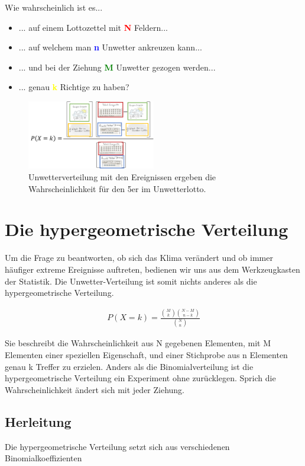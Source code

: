 \begin{refsection}
Wie wahrscheinlich ist es...

\begin{itemize}
\item ... auf einem Lottozettel mit \textcolor{red}{\textbf{N}} Feldern...
\item ... auf welchem man \textcolor{blue}{\textbf{n}} Unwetter ankreuzen kann...
\item ... und bei der Ziehung \textcolor{green}{\textbf{M}} Unwetter gezogen werden...
\item ... genau \textcolor{yellow}{\textbf{k}} Richtige zu haben?
\end{itemize}


\begin{figure}[htbp]
\centering
\includegraphics[width=0.5\textwidth]{extrem/Unwettervert.pdf}
\caption{Unwetterverteilung mit den Ereignissen ergeben die Wahrscheinlichkeit für den 5er im Unwetterlotto.}
\label{UnwetterVerteilung}
\end{figure}

\section{Die hypergeometrische Verteilung}
Um die Frage zu beantworten, ob sich das Klima verändert und ob immer häufiger extreme Ereignisse auftreten, bedienen wir uns aus dem Werkzeugkasten der Statistik. Die Unwetter-Verteilung ist somit nichts anderes als die hypergeometrische Verteilung. 

\begin{align*}
P(X = k) = 
\frac{ \binom{M}{k} \binom{N-M}{n-k}}{ \binom{N}{n} }
\end{align*}

Sie beschreibt die Wahrscheinlichkeit aus N gegebenen Elementen, mit M Elementen einer speziellen Eigenschaft, und einer Stichprobe aus n Elementen genau k Treffer zu erzielen. 
Anders als die Binomialverteilung ist die hypergeometrische Verteilung ein Experiment ohne zurücklegen. Sprich die Wahrscheinlichkeit ändert sich mit jeder Ziehung.



\subsection{Herleitung}
Die hypergeometrische Verteilung setzt sich aus verschiedenen Binomialkoeffizienten


\end{refsection}
